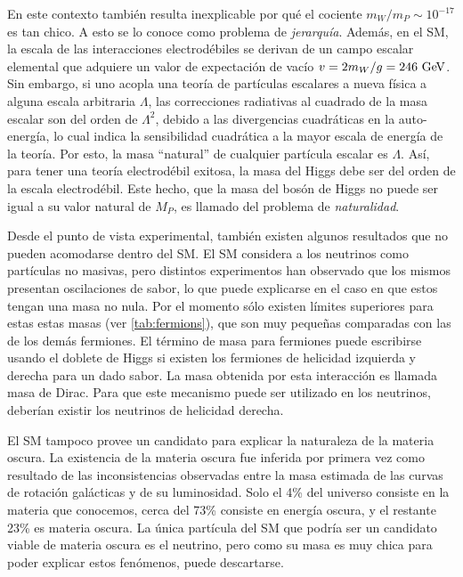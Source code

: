 En este contexto también resulta inexplicable por qué el cociente $m_W/m_P \sim
10^{-17}$ es tan chico. A esto se lo conoce como problema de \emph{jerarquía}.
Además, en el SM, la escala de las interacciones electrodébiles se derivan de un
campo escalar elemental que adquiere un valor de expectación de vacío $v = 2
m_W /g = 246 \gev$. Sin embargo, si uno acopla una teoría de partículas
escalares a nueva física a alguna escala arbitraria $\Lambda$, las correcciones
radiativas al cuadrado de la masa escalar son del orden de $\Lambda^2$, debido a
las divergencias cuadráticas en la auto-energía, lo cual indica la sensibilidad
cuadrática a la mayor escala de energía de la teoría. Por esto, la masa
``natural'' de cualquier partícula escalar es $\Lambda$. Así, para tener una teoría
electrodébil exitosa, la masa del Higgs debe ser del orden de la escala
electrodébil. Este hecho, que la masa del bosón de Higgs no puede ser igual a su
valor natural de $M_P$, es llamado del problema de \emph{naturalidad}.

Desde el punto de vista experimental, también existen algunos resultados que no
pueden acomodarse dentro del SM. El SM considera a los neutrinos como partículas
no masivas, pero distintos
experimentos\cite{PhysRevLett.101.111301,PhysRevD.78.032002} han observado
que los mismos presentan oscilaciones de sabor, lo que puede explicarse en el caso en
que estos tengan una masa no nula. Por el momento sólo existen límites
superiores para estas estas masas (ver \cref{tab:fermions}), que son muy peque\~nas
comparadas con las de los demás fermiones. El término de
masa para fermiones puede escribirse usando el doblete de Higgs si existen los
fermiones de helicidad izquierda y derecha para un dado sabor. La masa obtenida
por esta interacción es llamada masa de Dirac. Para que este mecanismo puede ser
utilizado en los neutrinos, deberían existir los neutrinos de helicidad derecha.

El SM tampoco provee un candidato para explicar la naturaleza de la materia
oscura. La existencia de la materia oscura fue inferida por primera vez como
resultado de las inconsistencias observadas entre la masa estimada de las curvas
de rotación galácticas y de su luminosidad\cite{DM1}.
Solo el 4\% del universo consiste en la materia que
conocemos\cite{DM2}, cerca del 73\% consiste en energía oscura, y el restante
23\% es materia oscura.
La única
partícula del SM que podría ser un candidato viable de materia oscura es el
neutrino, pero como su masa es muy chica para poder explicar estos fenómenos,
puede descartarse.

